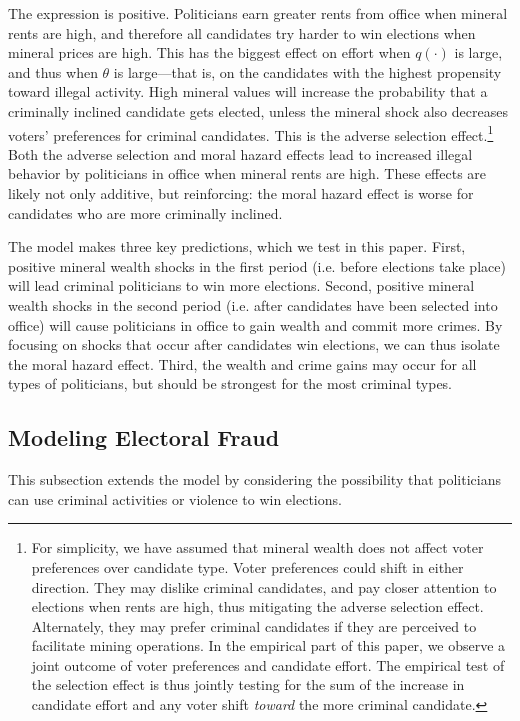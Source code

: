 \noindent The expression is positive. Politicians earn greater rents from office
when mineral rents are high, and therefore all candidates try
harder to win elections when mineral prices are high.
This has the biggest effect on effort when $q(\cdot)$ is large, and
thus when $\theta$ is large---that is, on the candidates with the
highest propensity toward illegal activity.  High mineral values will
increase the probability that a criminally inclined candidate gets
elected, unless the mineral shock also decreases voters' preferences
for criminal candidates. This is the adverse selection
effect.\footnote{For simplicity, we have assumed that mineral wealth
  does not affect voter preferences over candidate type. Voter
  preferences could shift in either direction. They may dislike
  criminal candidates, and pay closer attention to elections when
  rents are high, thus mitigating the adverse selection
  effect. Alternately, they may prefer criminal candidates if they are
  perceived to facilitate mining operations.  In the empirical part of
  this paper, we observe a joint outcome of voter preferences and
  candidate effort. The empirical test of the selection effect is thus
  jointly testing for the sum of the increase in candidate effort and
  any voter shift \textit{toward} the more criminal candidate.}  Both
the adverse selection and moral hazard effects lead to increased
illegal behavior by politicians in office when mineral rents are
high. These effects are likely not only additive, but reinforcing: the
moral hazard effect is worse for candidates who are more criminally
inclined. 

The model makes three key predictions, which we test in this
paper. First, positive mineral wealth shocks in the first period (i.e.
before elections take place) will lead criminal politicians to win
more elections. Second, positive mineral wealth shocks in the second
period (i.e. after candidates have been selected into office) will
cause politicians in office to gain wealth and commit more crimes. By
focusing on shocks that occur after candidates win elections, we can
thus isolate the moral hazard effect. Third, the wealth and crime
gains may occur for all types of politicians, but should be strongest
for the most criminal types.


\subsection{Modeling Electoral Fraud}
\label{app:model_fraud}

This subsection extends the model by considering the possibility that
politicians can use criminal activities or violence to win elections.

